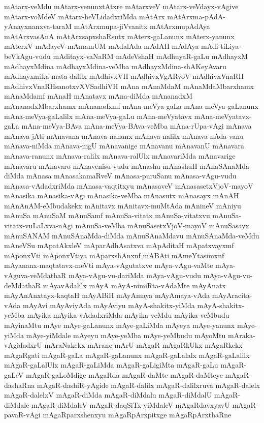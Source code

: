 {mAtarx-veMdu
mAtarx-venunxtAtxre
mAtarxveV
mAtarx-veVdayx-vAgive
mAtarx-voMdeV
mAtarx-heVLidadxriMda
mAtArx
mAtArxma-pAdA-yAnayxnanxva-taraM
mAtArxmupa-jiVvanitx
mAtArxmupAdAya
mAtArxvasAnA
mAtArxsapxshaRsutx
mAterx-gaLanunx
mAterx-yanunx
mAterxV
mAdayeV-mAmamUM
mAdalAda
mAdAH
mAdAya
mAdi-tiLiya-beVkAgu-vudu
mAditayx-vaNaRM
mAdeVshaH
mAdhuyaR-gaLu
mAdhayxM
mAdhayxMdina
mAdhayxMdina-veMba
mAdhayxMdina-shAKeyAvaru
mAdhayxmika-mata-dalilx
mAdhivxVH
mAdhivxVgARvoV
mAdhivxVnaRH
mAdhivxVnaRHsanotxvXVSadhiVH
mAna
mAnaMdaM
mAnaMdaMbarxhamx
mAnaMdamf
mAnaH
mAnatavx
mAna-diMda
mAnanadxM
mAnanadxMbarxhamx
mAnanadxmf
mAna-meVya-gaLa
mAna-meVya-gaLanunx
mAna-meVya-gaLalilx
mAna-meVya-gaLu
mAna-meVyatavx
mAna-meVyatavx-gaLa
mAna-meVya-BAva
mAna-meVya-BAva-veMba
mAna-rUpa-vAgi
mAnava
mAnava-jAti
mAnavana
mAnava-nanunx
mAnava-nalilx
mAnava-nAda-vanu
mAnava-niMda
mAnava-nigU
mAnavanige
mAnavanu
mAnavanU
mAnavara
mAnava-ranunx
mAnava-ralilx
mAnava-ralUlx
mAnavariMda
mAnavarige
mAnavaru
mAnavaro
mAnavenisu-vudu
mAnashu
mAnashuH
mAnaSAnaMda-diMda
mAnasa
mAnasakamaRveV
mAnasa-puruSanu
mAnasa-vAgu-vudu
mAnasa-vAdadxriMda
mAnasa-vaqtitxyu
mAnasaveV
mAnasasetxVjoV-mayoV
mAnasika
mAnasika-vAgi
mAnasika-veMba
mAnasutx
mAnasayx
mAnAH
mAnAnAM-eMbudakekx
mAnitavx
mAnitavx-muMtAda
mAnineV
mAniyu
mAnuSa
mAnuSaM
mAnuSamf
mAnuSa-vitatx
mAnuSa-vitatxvu
mAnuSa-vitatx-vuLaLxva-nAgi
mAnuSa-veMba
mAnuSasetxVjoV-mayoV
mAnuSasayx
mAnuSANAM
mAnuSAnaMda-diMda
mAnuSAnaMdavu
mAnuSAnaMda-veMdu
mAneVSu
mApatAkxleV
mAparAdhAsatxva
mApAditaH
mApatxvayxmf
mAponxVti
mAponxVtiya
mAparxshAnxnf
mABAti
mAmeYtasimxnf
mAyananx-maqtatavx-meVti
mAya-vAgutatxve
mAya-vAgu-vaMte
mAya-vAguva-veMdathaR
mAya-vAgu-vu-dariMda
mAya-vAgu-vudu
mAya-vAgu-vu-deMdathaR
mAyavAdalilx
mAyA
mAyA-nimiRta-vAdaMte
mAyAnatx
mAyAnAnxtayx-kaqtaH
mAyABiH
mAyAmaya
mAyAmaya-vAda
mAyAracita-vAda
mAyAvi
mAyAviyAda
mAyAviyu
mAyA-shakitx-yiMda
mAyA-shakitx-yeMba
mAyika
mAyika-vAdadxriMda
mAyika-veMdu
mAyika-veMbudu
mAyinaMtu
mAye
mAye-gaLanunx
mAye-gaLiMda
mAyeya
mAye-yanunx
mAye-yiMda
mAye-yiMdale
mAyeyu
mAye-yeMba
mAye-yeMbudu
mAyoMtu
mAraka-vAgidadxrU
mAraNakekx
mArane
mArU
mAgaR
mAgaRkUkx
mAgaRkekx
mAgaRgati
mAgaR-gaLa
mAgaR-gaLanunx
mAgaR-gaLalalx
mAgaR-gaLalilx
mAgaR-gaLalUlx
mAgaR-gaLiMda
mAgaR-gaLigiMta
mAgaR-gaLu
mAgaR-gaLeV
mAgaR-gaLoMdige
mAgaRda
mAgaR-daMte
mAgaR-daMteye
mAgaR-dashaRna
mAgaR-dashiR-yAgide
mAgaR-dalilx
mAgaR-dalilxruva
mAgaR-dalelx
mAgaR-dalelxV
mAgaR-diMda
mAgaR-diMdalu
mAgaR-diMdalU
mAgaR-diMdale
mAgaR-diMdaleV
mAgaR-daqSiTx-yiMdaleV
mAgaRdavxyavU
mAgaR-pavaR-vAgi
mAgaRparxshenxyu
mAgaRpArxpitxge
mAgaRpArxthaRne
}
